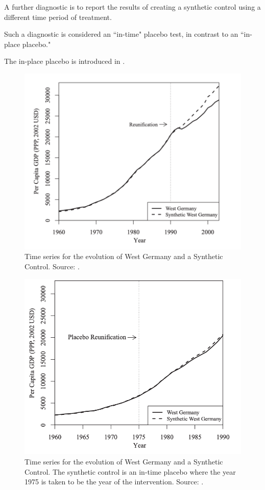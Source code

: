 \documentclass[notes,11pt, aspectratio=169]{beamer}
\begin{document}
\begin{frame}{}

    A further diagnostic is to report the results of creating a synthetic control using a different time period of treatment.

    \medskip

    Such a diagnostic is considered an ``in-time" placebo test, in contrast to an ``in-place placebo." \pause

    \medskip
    
    The in-place placebo is introduced in \cite{abadie_comparative_2015}.

\end{frame}


\begin{frame}{}
    \begin{figure}
        \centering
        \includegraphics[width = .5\linewidth]{figures/reunif_normal.png}
        \caption*{\small Time series for the evolution of West Germany and a Synthetic Control.
        Source: \cite{abadie_comparative_2015}.}
    \end{figure}
\end{frame}

\begin{frame}{}
    \begin{figure}
        \centering
        \includegraphics[width = .5\linewidth]{figures/reunif_plac.png}
        \caption*{\small Time series for the evolution of West Germany and a Synthetic Control.
        The synthetic control is an in-time placebo where the year 1975 is taken to be the
        year of the intervention.
        Source: \cite{abadie_comparative_2015}.}
    \end{figure}
\end{frame}
\end{document}
